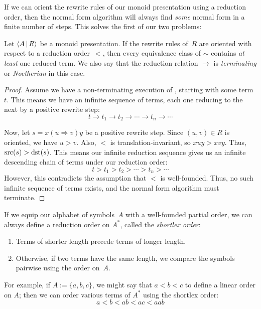 \documentclass[../generics]{subfiles}
\begin{document}
If we can orient the rewrite rules of our monoid presentation using a reduction order, then the normal form algorithm will always find \emph{some} normal form in a finite number of steps. This solves the first of our two problems:

\begin{theorem}
Let $\langle A\,|\,R\rangle$ be a monoid presentation. If the rewrite rules of~$R$ are oriented with respect to a reduction order~$<$, then every equivalence class of $\sim$ contains \emph{at least} one reduced term. We also say that the reduction relation $\rightarrow$ is \emph{terminating} or \emph{Noetherian} in this case.
\end{theorem}
\begin{proof}
Assume we have a non-terminating execution of , starting with some term~$t$. This means we have an infinite sequence of terms, each one reducing to the next by a positive rewrite step:
\[ t\rightarrow t_1\rightarrow t_2 \rightarrow \cdots \rightarrow t_n \rightarrow \cdots \]

Now, let $s=x(u\Rightarrow v)y$ be a positive rewrite step. Since $(u,v)\in R$ is oriented, we have $u>v$. Also, $<$ is translation-invariant, so $xuy>xvy$. Thus, $\operatorname{src}(s)>\operatorname{dst}(s)$. This means our infinite reduction sequence gives us an infinite descending chain of terms under our reduction order:
\[ t > t_1 > t_2 > \cdots > t_n > \cdots \]
However, this contradicts the assumption that $<$ is well-founded. Thus, no such infinite sequence of terms exists, and the normal form algorithm must terminate.
\end{proof}

If we equip our alphabet of symbols~$A$ with a well-founded partial order, we can always define a reduction order on $A^*$, called the \emph{shortlex order}:
\begin{enumerate}
\item Terms of shorter length precede terms of longer length.
\item Otherwise, if two terms have the same length, we compare the symbols pairwise using the order on~$A$.
\end{enumerate}
For example, if $A:=\{a,b,c\}$, we might say that $a<b<c$ to define a linear order on $A$; then we can order various terms of $A^*$ using the shortlex order: \[a<b<ab<ac<aab\]
\end{document}
